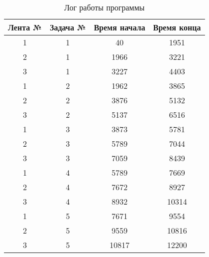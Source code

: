 \begin{table}[H]
    \caption{\centering Лог работы программы}
    \centering
    \begin{tabular}{|c|c|c|c|}
    \hline
    \multicolumn{1}{|l|}{Лента №} & \multicolumn{1}{l|}{Задача №} & \multicolumn{1}{l|}{Время начала} & \multicolumn{1}{l|}{Время конца} \\ \hline
    1                             & 1                             & 40                                & 1951                             \\ \hline
    2                             & 1                             & 1966                              & 3221                             \\ \hline
    3                             & 1                             & 3227                              & 4403                             \\ \hline
    1                             & 2                             & 1962                              & 3865                             \\ \hline
    2                             & 2                             & 3876                              & 5132                             \\ \hline
    3                             & 2                             & 5137                              & 6516                             \\ \hline
    1                             & 3                             & 3873                              & 5781                             \\ \hline
    2                             & 3                             & 5789                              & 7044                             \\ \hline
    3                             & 3                             & 7059                              & 8439                             \\ \hline
    1                             & 4                             & 5789                              & 7669                             \\ \hline
    2                             & 4                             & 7672                              & 8927                             \\ \hline
    3                             & 4                             & 8932                              & 10314                            \\ \hline
    1                             & 5                             & 7671                              & 9554                             \\ \hline
    2                             & 5                             & 9559                              & 10816                            \\ \hline
    3                             & 5                             & 10817                             & 12200                            \\ \hline
    \end{tabular}
    \label{tab:time}
\end{table}


